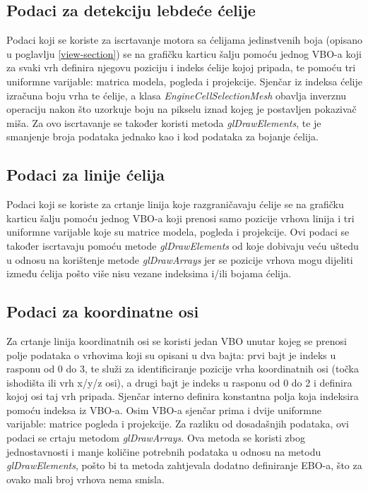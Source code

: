 \documentclass[times, utf8, diplomski]{fer}
\begin{document}
\subsection{Podaci za detekciju lebdeće ćelije}

Podaci koji se koriste za iscrtavanje motora sa ćelijama jedinstvenih boja (opisano u poglavlju \ref{view-section}) se na grafičku karticu šalju pomoću jednog VBO-a koji za svaki vrh definira njegovu poziciju i indeks ćelije kojoj pripada, te pomoću tri uniformne varijable: matrica modela, pogleda i projekcije. Sjenčar iz indeksa ćelije izračuna boju vrha te ćelije, a klasa \textit{EngineCellSelectionMesh} obavlja inverznu operaciju nakon što uzorkuje boju na pikselu iznad kojeg je postavljen pokazivač miša. Za ovo iscrtavanje se također koristi metoda \textit{glDrawElements}, te je smanjenje broja podataka jednako kao i kod podataka za bojanje ćelija.

\subsection{Podaci za linije ćelija}

Podaci koji se koriste za crtanje linija koje razgraničavaju ćelije se na grafičku karticu šalju pomoću jednog VBO-a koji prenosi samo pozicije vrhova linija i tri uniformne varijable koje su matrice modela, pogleda i projekcije. Ovi podaci se također iscrtavaju pomoću metode \textit{glDrawElements} od koje dobivaju veću uštedu u odnosu na korištenje metode \textit{glDrawArrays} jer se pozicije vrhova mogu dijeliti između ćelija pošto više nisu vezane indeksima i/ili bojama ćelija.

\subsection{Podaci za koordinatne osi}
Za crtanje linija koordinatnih osi se koristi jedan VBO unutar kojeg se prenosi polje podataka o vrhovima koji su opisani u dva bajta: prvi bajt je indeks u rasponu od 0 do 3, te služi za identificiranje pozicije vrha koordinatnih osi (točka ishodišta ili vrh x/y/z osi), a drugi bajt je indeks u rasponu od 0 do 2 i definira kojoj osi taj vrh pripada. Sjenčar interno definira konstantna polja koja indeksira pomoću indeksa iz VBO-a. Osim VBO-a sjenčar prima i dvije uniformne varijable: matrice pogleda i projekcije. Za razliku od dosadašnjih podataka, ovi podaci se crtaju metodom \textit{glDrawArrays}. Ova metoda se koristi zbog jednostavnosti i manje količine potrebnih podataka u odnosu na metodu \textit{glDrawElements}, pošto bi ta metoda zahtjevala dodatno definiranje EBO-a, što za ovako mali broj vrhova nema smisla.
\end{document}
